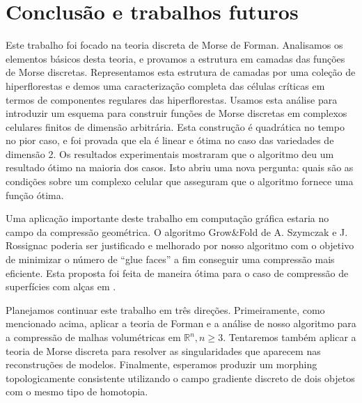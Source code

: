 \documentclass[dissertacao,brazil]{ThesisPUC}
\newcommand{\Rset}{\mathbb{R}}
\begin{document}
\chapter{Conclus\~{a}o e trabalhos futuros}

Este trabalho foi focado na teoria discreta de Morse de Forman. Analisamos os elementos b\'{a}sicos desta teoria, e provamos a estrutura em camadas das fun\c{c}\~{o}es de Morse discretas. Representamos esta estrutura de camadas por uma cole\c{c}\~{a}o de hiperflorestas e demos uma caracteriza\c{c}\~{a}o completa das c\'{e}lulas cr\'{i}ticas em termos de componentes regulares das hiperflorestas. Usamos esta an\'{a}lise para introduzir um esquema para construir fun\c{c}\~{o}es de Morse discretas em complexos celulares finitos de dimens\~{a}o arbitr\'{a}ria. Esta constru\c{c}\~{a}o \'{e} quadr\'{a}tica no tempo no pior caso, e foi provada que ela \'{e} linear e \'{o}tima no caso das variedades de dimens\~{a}o 2. Os resultados experimentais mostraram que o algoritmo deu um resultado \'{o}timo na maioria dos casos. Isto abriu uma nova pergunta: quais s\~{a}o as condi\c{c}\~{o}es sobre um complexo celular que asseguram que o algoritmo fornece uma fun\c{c}\~{a}o \'{o}tima.


Uma aplica\c{c}\~{a}o importante deste trabalho em computa\c{c}\~{a}o gr\'{a}fica estaria no campo da compress\~{a}o geom\'{e}trica. O algoritmo Grow\&Fold de A. Szymczak e J. Rossignac \cite{Szy00} poderia ser justificado e melhorado por nosso algoritmo com o objetivo de minimizar o n\'{u}mero de ``glue faces'' a fim conseguir uma compress\~{a}o mais eficiente. Esta proposta foi feita de maneira \'{o}tima para o caso de compress\~{a}o de superf\'{i}cies com al\c{c}as em \cite{Lop02}.

Planejamos continuar este trabalho em tr\^{e}s dire\c{c}\~{o}es. Primeiramente, como mencionado acima, aplicar a teoria de Forman e a an\'{a}lise de nosso algoritmo para a compress\~{a}o de malhas volum\'{e}tricas em $\Rset^{n}, n \geq 3$. Tentaremos tamb\'{e}m aplicar a teoria de Morse discreta para resolver as singularidades que aparecem nas reconstru\c{c}\~{o}es de modelos. Finalmente, esperamos produzir um morphing topologicamente consistente utilizando o campo gradiente discreto de dois objetos com o mesmo tipo de homotopia.
\end{document}
